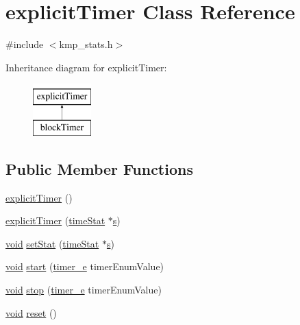 \hypertarget{classexplicitTimer}{\section{explicit\-Timer Class Reference}
\label{classexplicitTimer}
}


{\ttfamily \#include $<$kmp\-\_\-stats.\-h$>$}

Inheritance diagram for explicit\-Timer\-:\begin{figure}[H]
\begin{center}
\leavevmode
\includegraphics[height=2.000000cm]{classexplicitTimer}
\end{center}
\end{figure}
\subsection*{Public Member Functions}
\begin{DoxyCompactItemize}
\item 
\hyperlink{classexplicitTimer_a6c4946c5479d998e1e12610cd8ca2fe6}{explicit\-Timer} ()
\item 
\hyperlink{classexplicitTimer_ab52fc729eb83047573b962d5b7485098}{explicit\-Timer} (\hyperlink{classtimeStat}{time\-Stat} $\ast$\hyperlink{ittnotify__static_8h_a110bd9ede250f97ce56d81bb3c7b171d}{s})
\item 
\hyperlink{ittnotify__static_8h_af941d56e55e3c5465135b60c4d6343ed}{void} \hyperlink{classexplicitTimer_aacaaa414c0d68d0ba3cab075036baf63}{set\-Stat} (\hyperlink{classtimeStat}{time\-Stat} $\ast$\hyperlink{ittnotify__static_8h_a110bd9ede250f97ce56d81bb3c7b171d}{s})
\item 
\hyperlink{ittnotify__static_8h_af941d56e55e3c5465135b60c4d6343ed}{void} \hyperlink{classexplicitTimer_a0650affa704a742ae6aae4bf569e964c}{start} (\hyperlink{kmp__stats_8h_ae03f1e0ff609f86afa9b7167a12c6c06}{timer\-\_\-e} timer\-Enum\-Value)
\item 
\hyperlink{ittnotify__static_8h_af941d56e55e3c5465135b60c4d6343ed}{void} \hyperlink{classexplicitTimer_a1a3507bd5e0661935ee7766580244051}{stop} (\hyperlink{kmp__stats_8h_ae03f1e0ff609f86afa9b7167a12c6c06}{timer\-\_\-e} timer\-Enum\-Value)
\item 
\hyperlink{ittnotify__static_8h_af941d56e55e3c5465135b60c4d6343ed}{void} \hyperlink{classexplicitTimer_a29a8aeb9f1f2b5abcd70fc6d6c02eda9}{reset} ()
\end{DoxyCompactItemize}
